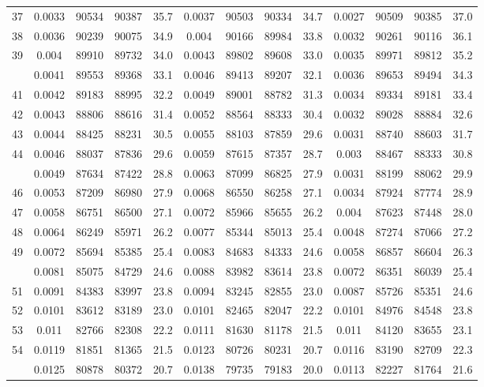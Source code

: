 \documentclass[
  14pt,
]{article}
\begin{document}
\begin{longtable}[t]{lcccccccccccc}
37 & 0.0033 & 90534 & 90387 & 35.7 & 0.0037 & 90503 & 90334 & 34.7 & 0.0027 & 90509 & 90385 & 37.0\\
38 & 0.0036 & 90239 & 90075 & 34.9 & 0.004 & 90166 & 89984 & 33.8 & 0.0032 & 90261 & 90116 & 36.1\\
39 & 0.004 & 89910 & 89732 & 34.0 & 0.0043 & 89802 & 89608 & 33.0 & 0.0035 & 89971 & 89812 & 35.2\\
\addlinespace
40 & 0.0041 & 89553 & 89368 & 33.1 & 0.0046 & 89413 & 89207 & 32.1 & 0.0036 & 89653 & 89494 & 34.3\\
41 & 0.0042 & 89183 & 88995 & 32.2 & 0.0049 & 89001 & 88782 & 31.3 & 0.0034 & 89334 & 89181 & 33.4\\
42 & 0.0043 & 88806 & 88616 & 31.4 & 0.0052 & 88564 & 88333 & 30.4 & 0.0032 & 89028 & 88884 & 32.6\\
43 & 0.0044 & 88425 & 88231 & 30.5 & 0.0055 & 88103 & 87859 & 29.6 & 0.0031 & 88740 & 88603 & 31.7\\
44 & 0.0046 & 88037 & 87836 & 29.6 & 0.0059 & 87615 & 87357 & 28.7 & 0.003 & 88467 & 88333 & 30.8\\
\addlinespace
45 & 0.0049 & 87634 & 87422 & 28.8 & 0.0063 & 87099 & 86825 & 27.9 & 0.0031 & 88199 & 88062 & 29.9\\
46 & 0.0053 & 87209 & 86980 & 27.9 & 0.0068 & 86550 & 86258 & 27.1 & 0.0034 & 87924 & 87774 & 28.9\\
47 & 0.0058 & 86751 & 86500 & 27.1 & 0.0072 & 85966 & 85655 & 26.2 & 0.004 & 87623 & 87448 & 28.0\\
48 & 0.0064 & 86249 & 85971 & 26.2 & 0.0077 & 85344 & 85013 & 25.4 & 0.0048 & 87274 & 87066 & 27.2\\
49 & 0.0072 & 85694 & 85385 & 25.4 & 0.0083 & 84683 & 84333 & 24.6 & 0.0058 & 86857 & 86604 & 26.3\\
\addlinespace
50 & 0.0081 & 85075 & 84729 & 24.6 & 0.0088 & 83982 & 83614 & 23.8 & 0.0072 & 86351 & 86039 & 25.4\\
51 & 0.0091 & 84383 & 83997 & 23.8 & 0.0094 & 83245 & 82855 & 23.0 & 0.0087 & 85726 & 85351 & 24.6\\
52 & 0.0101 & 83612 & 83189 & 23.0 & 0.0101 & 82465 & 82047 & 22.2 & 0.0101 & 84976 & 84548 & 23.8\\
53 & 0.011 & 82766 & 82308 & 22.2 & 0.0111 & 81630 & 81178 & 21.5 & 0.011 & 84120 & 83655 & 23.1\\
54 & 0.0119 & 81851 & 81365 & 21.5 & 0.0123 & 80726 & 80231 & 20.7 & 0.0116 & 83190 & 82709 & 22.3\\
\addlinespace
55 & 0.0125 & 80878 & 80372 & 20.7 & 0.0138 & 79735 & 79183 & 20.0 & 0.0113 & 82227 & 81764 & 21.6\\

\end{longtable}
\end{document}
